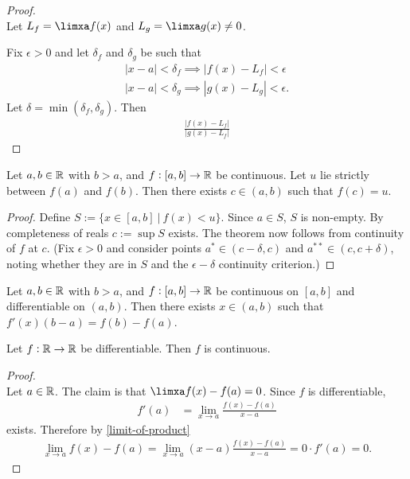 \begin{proof}~\\
  Let $L_f = \limxa f(x)$ and $L_g = \limxa g(x) \neq 0$.

  Fix $\epsilon > 0$ and let $\delta_f$ and $\delta_g$ be such that
  \begin{align*}
    |x - a| < \delta_f \implies |f(x) - L_f| < \epsilon\\
    |x - a| < \delta_g \implies |g(x) - L_g| < \epsilon.
  \end{align*}
  Let $\delta = \min(\delta_f, \delta_g)$. Then
  \begin{align*}
    \frac{|f(x) - L_f|}{|g(x) - L_f|}
  \end{align*}
\end{proof}


\begin{theorem*}
  Let $a, b \in \mathbb{R}$ with $b > a$, and $f:[a,b] \to \mathbb{R}$ be continuous. Let $u$ lie strictly between
  $f(a)$ and $f(b)$. Then there exists $c \in (a, b)$ such that $f(c) = u$.
\end{theorem*}

\begin{proof}
  Define $S := \{x \in [a, b] ~|~ f(x) < u\}$. Since $a \in S$, $S$ is non-empty. By completeness
  of reals $c := \sup S$ exists. The theorem now follows from continuity of $f$ at $c$. (Fix
  $\epsilon > 0$ and consider points $a^* \in (c - \delta, c)$ and $a^{**} \in (c, c + \delta)$,
  noting whether they are in $S$ and the $\epsilon-\delta$ continuity criterion.)
\end{proof}

\begin{theorem*}
  Let $a, b \in \mathbb{R}$ with $b > a$, and $f:[a,b] \to \mathbb{R}$ be continuous on $[a, b]$ and differentiable
  on $(a, b)$. Then there exists $x \in (a, b)$ such that $f'(x)(b - a) = f(b) - f(a)$.
\end{theorem*}


\begin{theorem*}
  Let $f:\mathbb{R}\to\mathbb{R}$ be differentiable. Then $f$ is continuous.
\end{theorem*}

\begin{proof}~\\
  Let $a \in \mathbb{R}$. The claim is that $\limxa f(x) - f(a) = 0$. Since $f$ is differentiable,
  \begin{align*}
    f'(a) &= \lim_{x \to a} \frac{f(x) - f(a)}{x - a}
  \end{align*}
  exists. Therefore by \eqref{limit-of-product}
  \begin{align*}
    \lim_{x \to a} f(x) - f(a) = \lim_{x \to a} (x - a)\frac{f(x) - f(a)}{x - a} = 0\cdot f'(a) = 0.
  \end{align*}
\end{proof}

